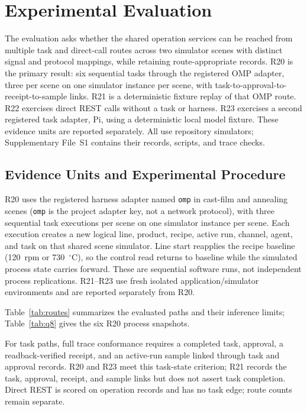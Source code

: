 \section{Experimental Evaluation}
\label{sec:eval}
The evaluation asks whether the shared operation services can be reached from
multiple task and direct-call routes across two simulator scenes with distinct
signal and protocol mappings, while retaining route-appropriate records. R20
is the primary result: six sequential tasks through the registered OMP
adapter, three per scene on one simulator instance per scene, with
task-to-approval-to-receipt-to-sample links. R21 is a deterministic fixture
replay of that OMP route. R22 exercises direct REST calls without a task or
harness. R23 exercises a second registered task adapter, Pi, using a
deterministic local model fixture. These evidence units are reported
separately. All use repository simulators; Supplementary File~S1 contains
their records, scripts, and trace checks.
\subsection{Evidence Units and Experimental Procedure}
\label{sec:testbed}
\label{sec:procedure}
R20 uses the registered harness adapter named \texttt{omp} in cast-film and
annealing scenes
(\texttt{omp} is the project adapter key, not a network protocol),
with three sequential task executions per scene on one simulator instance per
scene. Each execution creates a new logical line, product, recipe, active run,
channel, agent, and task on that shared scene simulator. Line start reapplies the recipe baseline
(120~rpm or 730~$^{\circ}$C), so the control read returns to baseline while
the simulated process state carries forward. These are sequential software
runs, not independent process replications. R21--R23 use fresh isolated
application/simulator environments and are reported separately from R20.

Table~\ref{tab:routes} summarizes the evaluated paths and their inference
limits; Table~\ref{tab:q8} gives the six R20 process snapshots.

For task paths, full trace conformance requires a completed task, approval, a
readback-verified receipt, and an active-run sample linked through task and
approval records. R20 and R23 meet this task-state criterion; R21 records the
task, approval, receipt, and sample links but does not assert task completion.
Direct REST is scored on operation records and has no task edge; route counts
remain separate.

